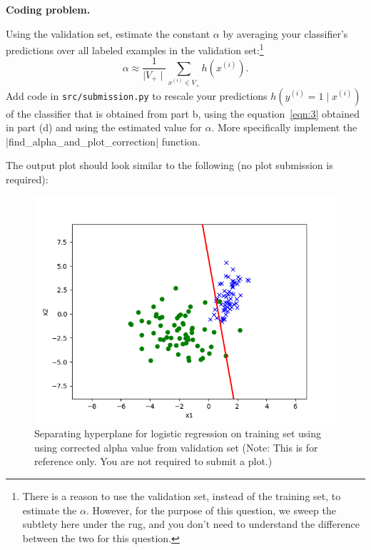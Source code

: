 \item {} \textbf{Coding problem.}

Using the validation set, estimate the constant $\alpha$ by averaging your
classifier's predictions over all labeled examples in the validation set:\footnote{There is a reason to use the validation set, instead of the training set, to estimate the $\alpha$. However, for the purpose of this question, we sweep the subtlety here under the rug, and you don't need to understand the difference between the two for this question. } 
%
\begin{equation*}
  \alpha \approx \frac{1}{\mid V_{+} \mid}\sum_{x^{(i)}\in V_{+}} h(x^{(i)}).
\end{equation*}
%
Add code in \texttt{src/submission.py} to rescale your
 predictions $h(y^{(i)}=1\mid x^{(i)})$ of the classifier that is obtained from part b,  using the equation~\eqref{eqn:3} obtained in part (d) and using the estimated value for $\alpha$. 
More specifically implement the |find_alpha_and_plot_correction| function.

 The output plot should look similar to the following (no plot submission is required):
 \begin{figure}[H]
   \centering
   \vspace{2mm}
   \includegraphics[width=0.5\linewidth]{02-posonly/posonly_adjusted_pred.png}
     \caption{Separating hyperplane for logistic regression on training set using using corrected alpha value from validation set (Note: This is for reference only.  You are not required to submit a plot.)}
 \end{figure}

